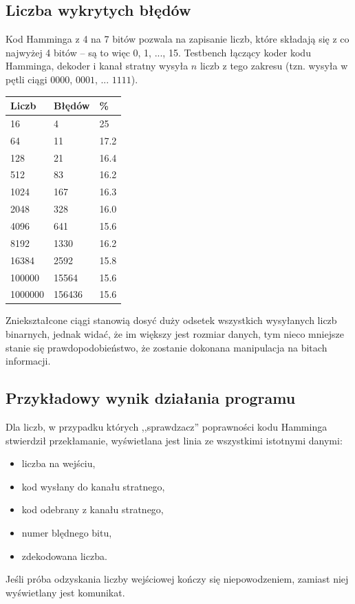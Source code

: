 \documentclass[a4paper,11pt]{article}
\begin{document}
  \subsection{Liczba wykrytych błędów}
    Kod Hamminga z 4 na 7 bitów pozwala na zapisanie liczb, które składają się z co najwyżej 4 bitów -- są to więc 0, 1, ..., 15. Testbench łączący koder kodu Hamminga, dekoder i kanał stratny wysyła $n$ liczb z tego zakresu (tzn. wysyła w pętli ciągi $0000$, $0001$, ... $1111$).
      \begin{table}[H]
      \centering
      \begin{tabular}{lll}
        Liczb & Błędów & \% \\ \hline
          16 & 4 & 25 \\
          64 & 11 & 17.2 \\
          128 & 21 & 16.4 \\
          512 & 83 & 16.2 \\
          1024 & 167 & 16.3 \\
          2048 & 328 & 16.0 \\
          4096 & 641 & 15.6 \\
          8192 & 1330 & 16.2 \\
          16384 & 2592 & 15.8 \\
          100000 & 15564 & 15.6 \\
          1000000 & 156436 & 15.6 \\
      \end{tabular}
      \end{table}

    Zniekształcone ciągi stanowią dosyć duży odsetek wszystkich wysyłanych liczb binarnych, jednak widać, że im większy jest rozmiar danych, tym nieco mniejsze stanie się prawdopodobieństwo, że zostanie dokonana manipulacja na bitach informacji. 

  \subsection{Przykładowy wynik działania programu}
  Dla liczb, w przypadku których ,,sprawdzacz'' poprawności kodu Hamminga stwierdził przekłamanie, wyświetlana jest linia ze wszystkimi istotnymi danymi:
  \begin{itemize}
    \item liczba na wejściu,
    \item kod wysłany do kanału stratnego,
    \item kod odebrany z kanału stratnego,
    \item numer blędnego bitu,
    \item zdekodowana liczba.
  \end{itemize}
    Jeśli próba odzyskania liczby wejściowej kończy się niepowodzeniem, zamiast niej wyświetlany jest komunikat.
\end{document}
